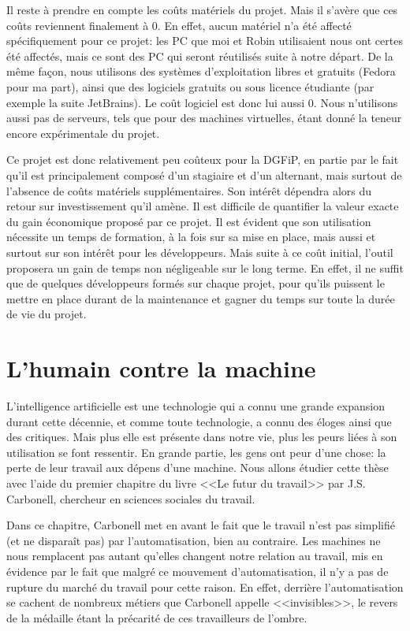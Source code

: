 \documentclass[openany, 11pt]{memoir}
\begin{document}
Il reste à prendre en compte les coûts matériels du projet. Mais il s'avère que ces coûts reviennent finalement à 0. En effet, aucun matériel n'a été affecté spécifiquement pour ce projet: les PC que moi et Robin utilisaient nous ont certes été affectés, mais ce sont des PC qui seront réutilisés suite à notre départ. De la même façon, nous utilisons des systèmes d'exploitation libres et gratuits (Fedora pour ma part), ainsi que des logiciels gratuits ou sous licence étudiante (par exemple la suite JetBrains). Le coût logiciel est donc lui aussi 0. Nous n'utilisons aussi pas de serveurs, tels que pour des machines virtuelles, étant donné la teneur encore expérimentale du projet.

Ce projet est donc relativement peu coûteux pour la DGFiP, en partie par le fait qu'il est principalement composé d'un stagiaire et d'un alternant, mais surtout de l'absence de coûts matériels supplémentaires. Son intérêt dépendra alors du retour sur investissement qu'il amène. Il est difficile de quantifier la valeur exacte du gain économique proposé par ce projet. Il est évident que son utilisation nécessite un temps de formation, à la fois sur sa mise en place, mais aussi et surtout sur son intérêt pour les développeurs. Mais suite à ce coût initial, l'outil proposera un gain de temps non négligeable sur le long terme. En effet, il ne suffit que de quelques développeurs formés sur chaque projet, pour qu'ils puissent le mettre en place durant de la maintenance et gagner du temps sur toute la durée de vie du projet.

\chapter{L'humain contre la machine}

L'intelligence artificielle est une technologie qui a connu une grande expansion durant cette décennie, et comme toute technologie, a connu des éloges ainsi que des critiques. Mais plus elle est présente dans notre vie, plus les peurs liées à son utilisation se font ressentir. En grande partie, les gens ont peur d'une chose: la perte de leur travail aux dépens d'une machine. Nous allons étudier cette thèse avec l'aide du premier chapitre du livre <<Le futur du travail>> \cite{futurtravail} par J.S. Carbonell, chercheur en sciences sociales du travail.

Dans ce chapitre, Carbonell met en avant le fait que le travail n'est pas simplifié (et ne disparaît pas) par l'automatisation, bien au contraire. Les machines ne nous remplacent pas autant qu'elles changent notre relation au travail, mis en évidence par le fait que malgré ce mouvement d'automatisation, il n'y a pas de rupture du marché du travail pour cette raison. En effet, derrière l'automatisation se cachent de nombreux métiers que Carbonell appelle <<invisibles>>, le revers de la médaille étant la précarité de ces travailleurs de l'ombre.
\end{document}

